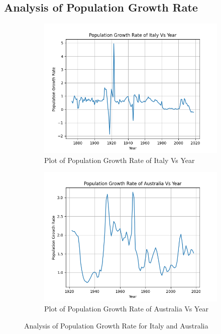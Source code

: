 \documentclass[fleqn, 11pt]{article}
\begin{document}
\subsection{Analysis of Population Growth Rate}
\begin{figure}[H]
    \centering
    \begin{subfigure}[H]{0.49\textwidth}
        \centering
        \includegraphics[width=\textwidth]{P4/plot_ita.png}
        \caption[]{Plot of Population Growth Rate of Italy Vs Year}
    \end{subfigure}
    \begin{subfigure}[H]{0.49\textwidth}
        \centering
        \includegraphics[width=\textwidth]{P4/plot_aus.png}
        \caption[]{Plot of Population Growth Rate of Australia Vs Year}
    \end{subfigure}
    \caption{Analysis of Population Growth Rate for Italy and Australia}
\end{figure}
\end{document}
